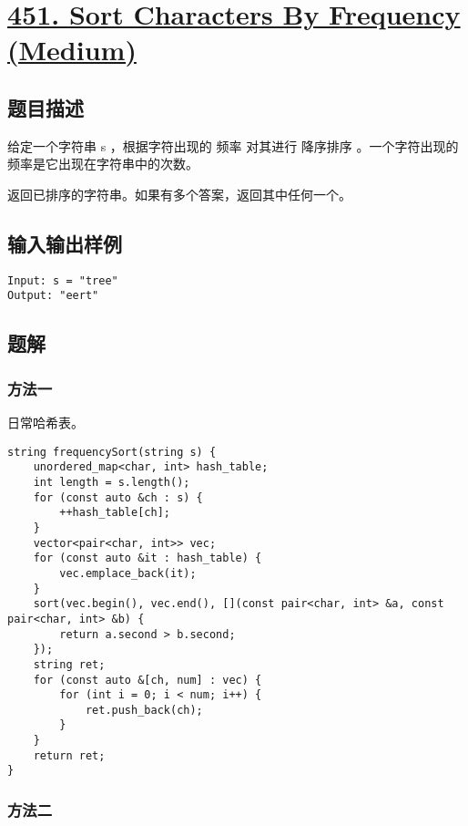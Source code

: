 \documentclass[lang=cn,10pt]{elegantbook}
\begin{document}
{\color{red}\section{\href{https://leetcode.cn/problems/sort-characters-by-frequency/}{451. Sort Characters By Frequency (Medium)}}} \label{ch5.451}

\subsection*{题目描述}

给定一个字符串 s ，根据字符出现的 频率 对其进行 降序排序 。一个字符出现的频率是它出现在字符串中的次数。

返回已排序的字符串。如果有多个答案，返回其中任何一个。

\subsection*{输入输出样例}

\begin{lstlisting}
Input: s = "tree"
Output: "eert"
\end{lstlisting}

\subsection*{题解}

\subsubsection*{方法一}

日常哈希表。

\begin{lstlisting}
string frequencySort(string s) {
	unordered_map<char, int> hash_table;
	int length = s.length();
	for (const auto &ch : s) {
		++hash_table[ch];
	}
	vector<pair<char, int>> vec;
	for (const auto &it : hash_table) {
		vec.emplace_back(it);
	}
	sort(vec.begin(), vec.end(), [](const pair<char, int> &a, const pair<char, int> &b) {
		return a.second > b.second;
	});
	string ret;
	for (const auto &[ch, num] : vec) {
		for (int i = 0; i < num; i++) {
			ret.push_back(ch);
		}
	}
	return ret;
}
\end{lstlisting}

\subsubsection*{方法二}
\end{document}
